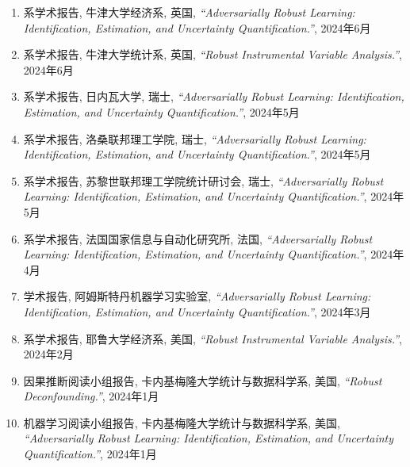 \documentclass[margin, line]{res}
\begin{document}
\begin{resume}
		\begin{enumerate}
			\setlength{\itemsep}{3pt}

			\item 系学术报告, 牛津大学经济系, 英国, {\it ``Adversarially Robust Learning: Identification, Estimation, and Uncertainty Quantification.''}, 
                2024年6月

            \item 系学术报告, 牛津大学统计系, 英国, {\it ``Robust Instrumental Variable Analysis.''}, 
                2024年6月

            \item 系学术报告, 日内瓦大学, 瑞士, {\it ``Adversarially Robust Learning: Identification, Estimation, and Uncertainty Quantification.''}, 
                2024年5月

            \item 系学术报告, 洛桑联邦理工学院, 瑞士, {\it ``Adversarially Robust Learning: Identification, Estimation, and Uncertainty Quantification.''}, 
                2024年5月

            \item 系学术报告, 苏黎世联邦理工学院统计研讨会, 瑞士, {\it ``Adversarially Robust Learning: Identification, Estimation, and Uncertainty Quantification.''}, 
                2024年5月

            \item 系学术报告, 法国国家信息与自动化研究所, 法国, {\it ``Adversarially Robust Learning: Identification, Estimation, and Uncertainty Quantification.''}, 
                2024年4月

            \item 学术报告, 阿姆斯特丹机器学习实验室, {\it ``Adversarially Robust Learning: Identification, Estimation, and Uncertainty Quantification.''}, 
                2024年3月

            \item 系学术报告, 耶鲁大学经济系, 美国, {\it ``Robust Instrumental Variable Analysis.''}, 
                2024年2月

            \item 因果推断阅读小组报告, 卡内基梅隆大学统计与数据科学系, 美国, {\it ``Robust Deconfounding.''}, 
                2024年1月

            \item 机器学习阅读小组报告, 卡内基梅隆大学统计与数据科学系, 美国, {\it ``Adversarially Robust Learning: Identification, Estimation, and Uncertainty Quantification.''}, 
                2024年1月


\end{enumerate}
\end{resume}
\end{document}
